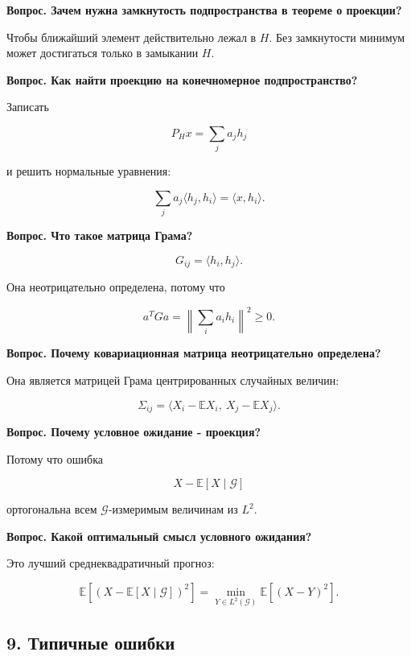 \documentclass[
  11pt,
  a4paper,
]{article}
\begin{document}
\textbf{Вопрос. Зачем нужна замкнутость подпространства в теореме о
проекции?}

Чтобы ближайший элемент действительно лежал в \(H\). Без замкнутости
минимум может достигаться только в замыкании \(H\).

\textbf{Вопрос. Как найти проекцию на конечномерное подпространство?}

Записать

\[
P_Hx=\sum_j a_jh_j
\]

и решить нормальные уравнения:

\[
\sum_j a_j\langle h_j,h_i\rangle=\langle x,h_i\rangle.
\]

\textbf{Вопрос. Что такое матрица Грама?}

\[
G_{ij}=\langle h_i,h_j\rangle.
\]

Она неотрицательно определена, потому что

\[
a^TGa=\left\|\sum_i a_ih_i\right\|^2\ge0.
\]

\textbf{Вопрос. Почему ковариационная матрица неотрицательно
определена?}

Она является матрицей Грама центрированных случайных величин:

\[
\Sigma_{ij}
=
\langle X_i-\mathbb EX_i,\ X_j-\mathbb EX_j\rangle.
\]

\textbf{Вопрос. Почему условное ожидание - проекция?}

Потому что ошибка

\[
X-\mathbb E[X\mid\mathcal G]
\]

ортогональна всем \(\mathcal G\)-измеримым величинам из \(L^2\).

\textbf{Вопрос. Какой оптимальный смысл условного ожидания?}

Это лучший среднеквадратичный прогноз:

\[
\mathbb E[(X-\mathbb E[X\mid\mathcal G])^2]
=
\min_{Y\in L^2(\mathcal G)}
\mathbb E[(X-Y)^2].
\]

\subsection{9. Типичные
ошибки}\label{ux442ux438ux43fux438ux447ux43dux44bux435-ux43eux448ux438ux431ux43aux438}
\end{document}
